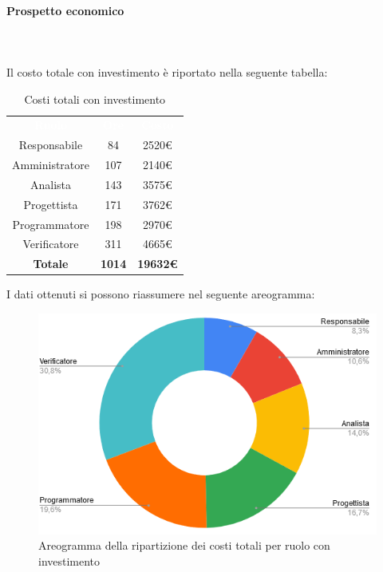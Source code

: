 \paragraph{Prospetto economico} \mbox{} \\ \mbox{} \\
Il costo totale con investimento è riportato nella seguente tabella:

\begin{table}[H]
\centering\renewcommand{\arraystretch}{1.5}
\caption{Costi totali con investimento}
\vspace{0.2cm}
\begin{tabular}{ c | c | c  }
\rowcolor{redafk}
\textcolor{white}{\textbf{Ruolo}} & \textcolor{white}{\textbf{Ore}} & 
\textcolor{white}{\textbf{Costo}}  \\
Responsabile & 84 & 2520€ \\
Amministratore & 107 & 2140€ \\
Analista & 143 & 3575€ \\
Progettista	& 171 & 3762€ \\
Programmatore & 198 & 2970€  \\
Verificatore & 311 & 4665€  \\
\rowcolor{lastrowcolor}
\textbf{Totale} & \textbf{1014} & \textbf{19632€}  \\
\end{tabular}
\end{table}

I dati ottenuti si possono riassumere nel seguente areogramma:
\begin{figure}[H]
\centering
\includegraphics[scale=0.60]{img/grafici/torta_tot_con_analisi.png}
\caption{Areogramma della ripartizione dei costi totali per ruolo con investimento}
\end{figure}


